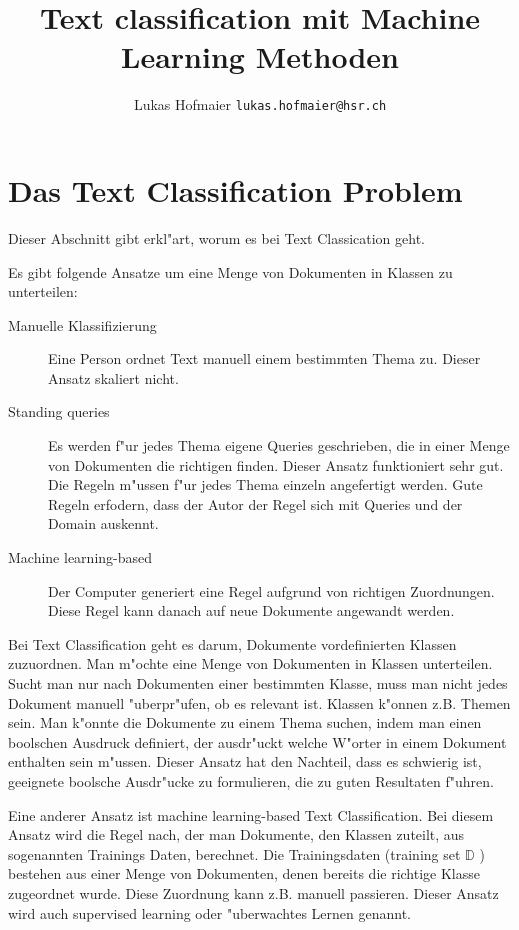 \documentclass[12pt,a4paper,twoside]{article}
\begin{document}
\lstset{
basicstyle=\small\ttfamily,
xleftmargin=3.5em,
language=Promela,
captionpos=b
}

\title{Text classification mit Machine Learning Methoden}
\author{Lukas Hofmaier \texttt{lukas.hofmaier@hsr.ch}}
\maketitle

\section{Das Text Classification Problem}
\label{sec:problem}

Dieser Abschnitt gibt erkl"art, worum es bei Text Classication geht.

Es gibt folgende Ansatze um eine Menge von Dokumenten in Klassen zu unterteilen:
\begin{description}
\item[Manuelle Klassifizierung] Eine Person ordnet Text manuell einem bestimmten Thema zu. Dieser Ansatz skaliert nicht.
\item[Standing queries] Es werden f"ur jedes Thema eigene Queries geschrieben, die in einer Menge von Dokumenten die richtigen finden. Dieser Ansatz funktioniert sehr gut. Die Regeln m"ussen f"ur jedes Thema einzeln angefertigt werden. Gute Regeln erfodern, dass der Autor der Regel sich mit Queries und der Domain auskennt.
\item[Machine learning-based] Der Computer generiert eine Regel aufgrund von richtigen Zuordnungen. Diese Regel kann danach auf neue Dokumente angewandt werden.
\end{description}


Bei Text Classification geht es darum, Dokumente vordefinierten Klassen zuzuordnen. Man m"ochte eine Menge von Dokumenten in Klassen unterteilen. Sucht man nur nach Dokumenten einer bestimmten Klasse, muss man nicht jedes Dokument manuell "uberpr"ufen, ob es relevant ist. Klassen k"onnen z.B. Themen sein. Man k"onnte die Dokumente zu einem Thema suchen, indem man einen boolschen Ausdruck definiert, der ausdr"uckt welche W"orter in einem Dokument enthalten sein m"ussen. Dieser Ansatz hat den Nachteil, dass es schwierig ist, geeignete boolsche Ausdr"ucke zu formulieren, die zu guten Resultaten f"uhren.

Eine anderer Ansatz ist machine learning-based Text Classification. Bei diesem Ansatz wird die Regel nach, der man Dokumente, den Klassen zuteilt, aus sogenannten Trainings Daten, berechnet. Die Trainingsdaten (training set $\mathbb{D}$ ) bestehen aus einer Menge von Dokumenten, denen bereits die richtige Klasse zugeordnet wurde. Diese Zuordnung kann z.B. manuell passieren. Dieser Ansatz wird auch supervised learning oder "uberwachtes Lernen genannt. 
\end{document}
